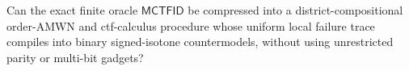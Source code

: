 Can the exact finite oracle \(\mathsf{MCTFID}\) be compressed into a district-compositional order-AMWN and ctf-calculus procedure whose uniform local failure trace compiles into binary signed-isotone countermodels, without using unrestricted parity or multi-bit gadgets?